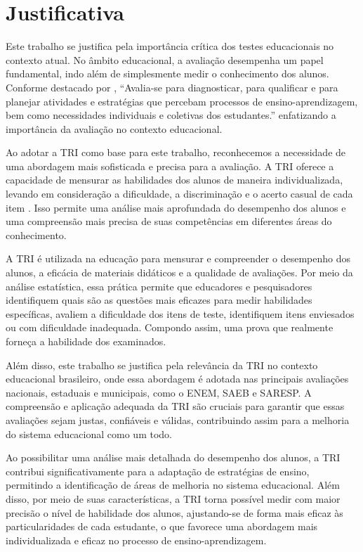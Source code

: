 \section{Justificativa}

Este trabalho se justifica pela importância crítica dos testes educacionais no contexto atual. No âmbito educacional, a avaliação desempenha um papel fundamental, indo além de simplesmente medir o conhecimento dos alunos. Conforme destacado por \cite{silva2019}, ``Avalia-se para diagnosticar, para qualificar e para planejar atividades e estratégias que percebam processos de ensino-aprendizagem, bem como necessidades individuais e coletivas dos estudantes.'' enfatizando a importância da avaliação no contexto educacional.

Ao adotar a TRI como base para este trabalho, reconhecemos a necessidade de uma abordagem mais sofisticada e precisa para a avaliação. A TRI oferece a capacidade de mensurar as habilidades dos alunos de maneira individualizada, levando em consideração a dificuldade, a discriminação e o acerto casual de cada item \cite{pasquali2018}. Isso permite uma análise mais aprofundada do desempenho dos alunos e uma compreensão mais precisa de suas competências em diferentes áreas do conhecimento.

A TRI é utilizada na educação para mensurar e compreender o desempenho dos alunos, a eficácia de materiais didáticos e a qualidade de avaliações. Por meio da análise estatística, essa prática permite que educadores e pesquisadores identifiquem quais são as questões mais eficazes para medir habilidades específicas, avaliem a dificuldade dos itens de teste, identifiquem itens enviesados ou com dificuldade inadequada. Compondo assim, uma prova que realmente forneça a habilidade dos examinados.

Além disso, este trabalho se justifica pela relevância da TRI no contexto educacional brasileiro, onde essa abordagem é adotada nas principais avaliações nacionais, estaduais e municipais, como o ENEM, SAEB e SARESP. A compreensão e aplicação adequada da TRI são cruciais para garantir que essas avaliações sejam justas, confiáveis e válidas, contribuindo assim para a melhoria do sistema educacional como um todo.

Ao possibilitar uma análise mais detalhada do desempenho dos alunos, a TRI contribui significativamente para a adaptação de estratégias de ensino, permitindo a identificação de áreas de melhoria no sistema educacional. Além disso, por meio de suas características, a TRI torna possível medir com maior precisão o nível de habilidade dos alunos, ajustando-se de forma mais eficaz às particularidades de cada estudante, o que favorece uma abordagem mais individualizada e eficaz no processo de ensino-aprendizagem.



